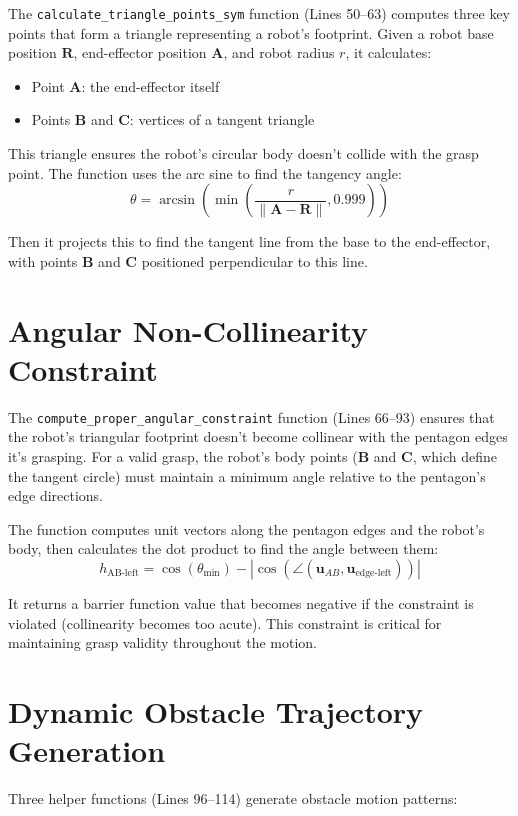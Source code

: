 \documentclass[12pt,a4paper]{article}
\begin{document}
The \texttt{calculate\_triangle\_points\_sym} function (Lines 50--63) computes three key points that form a triangle representing a robot's footprint. Given a robot base position $\mathbf{R}$, end-effector position $\mathbf{A}$, and robot radius $r$, it calculates:
\begin{itemize}
    \item Point $\mathbf{A}$: the end-effector itself
    \item Points $\mathbf{B}$ and $\mathbf{C}$: vertices of a tangent triangle
\end{itemize}

This triangle ensures the robot's circular body doesn't collide with the grasp point. The function uses the arc sine to find the tangency angle:
\[
\theta = \arcsin\left(\min\left(\frac{r}{\|\mathbf{A} - \mathbf{R}\|}, 0.999\right)\right)
\]

Then it projects this to find the tangent line from the base to the end-effector, with points $\mathbf{B}$ and $\mathbf{C}$ positioned perpendicular to this line.

\section{Angular Non-Collinearity Constraint}

The \texttt{compute\_proper\_angular\_constraint} function (Lines 66--93) ensures that the robot's triangular footprint doesn't become collinear with the pentagon edges it's grasping. For a valid grasp, the robot's body points ($\mathbf{B}$ and $\mathbf{C}$, which define the tangent circle) must maintain a minimum angle relative to the pentagon's edge directions.

The function computes unit vectors along the pentagon edges and the robot's body, then calculates the dot product to find the angle between them:
\[
h_{\text{AB-left}} = \cos(\theta_{\min}) - \left|\cos(\angle(\mathbf{u}_{AB}, \mathbf{u}_{\text{edge-left}}))\right|
\]

It returns a barrier function value that becomes negative if the constraint is violated (collinearity becomes too acute). This constraint is critical for maintaining grasp validity throughout the motion.

\section{Dynamic Obstacle Trajectory Generation}

Three helper functions (Lines 96--114) generate obstacle motion patterns:
\end{document}
